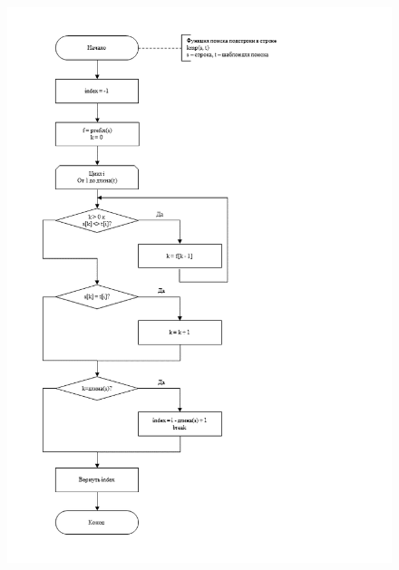\documentclass[../main.tex]{subfiles}
\begin{document}
	\begin{figure}[H]
		\centering
		\includegraphics[scale=0.7 ]{src/img/kmp-main}
		\caption{}
		\label{fig:kmp-main}
	\end{figure}
	
\end{document}
